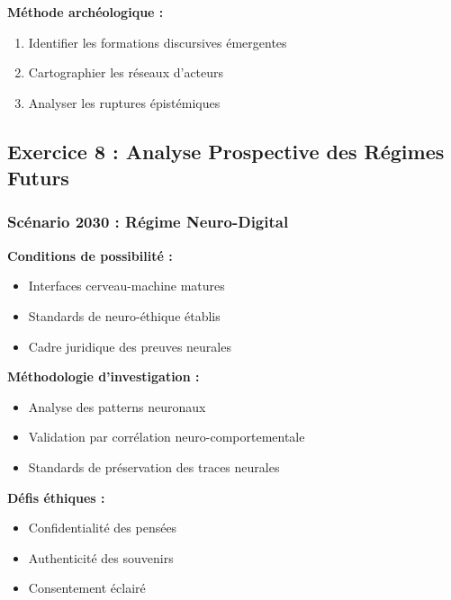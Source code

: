 \documentclass[12pt, a4paper]{article}
\begin{document}
\textbf{Méthode archéologique :}
\begin{enumerate}
\item Identifier les formations discursives émergentes
\item Cartographier les réseaux d'acteurs
\item Analyser les ruptures épistémiques
\end{enumerate}

\subsection*{Exercice 8 : Analyse Prospective des Régimes Futurs}

\subsubsection*{Scénario 2030 : Régime Neuro-Digital}

\textbf{Conditions de possibilité :}
\begin{itemize}
\item Interfaces cerveau-machine matures
\item Standards de neuro-éthique établis
\item Cadre juridique des preuves neurales
\end{itemize}

\textbf{Méthodologie d'investigation :}
\begin{itemize}
\item Analyse des patterns neuronaux
\item Validation par corrélation neuro-comportementale
\item Standards de préservation des traces neurales
\end{itemize}

\textbf{Défis éthiques :}
\begin{itemize}
\item Confidentialité des pensées
\item Authenticité des souvenirs
\item Consentement éclairé
\end{itemize}
\end{document}
